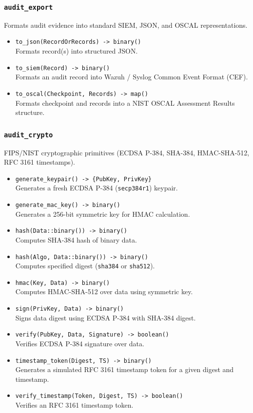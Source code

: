\documentclass{article}
\begin{document}
\subsubsection{\texttt{audit\_export}}
Formats audit evidence into standard SIEM, JSON, and OSCAL representations.
\begin{itemize}
    \item \texttt{to\_json(RecordOrRecords) -> binary()} \\
    Formats record(s) into structured JSON.
    \item \texttt{to\_siem(Record) -> binary()} \\
    Formats an audit record into Wazuh / Syslog Common Event Format (CEF).
    \item \texttt{to\_oscal(Checkpoint, Records) -> map()} \\
    Formats checkpoint and records into a NIST OSCAL Assessment Results structure.
\end{itemize}

\subsubsection{\texttt{audit\_crypto}}
FIPS/NIST cryptographic primitives (ECDSA P-384, SHA-384, HMAC-SHA-512, RFC 3161 timestamps).
\begin{itemize}
    \item \texttt{generate\_keypair() -> \{PubKey, PrivKey\}} \\
    Generates a fresh ECDSA P-384 (\texttt{secp384r1}) keypair.
    \item \texttt{generate\_mac\_key() -> binary()} \\
    Generates a 256-bit symmetric key for HMAC calculation.
    \item \texttt{hash(Data::binary()) -> binary()} \\
    Computes SHA-384 hash of binary data.
    \item \texttt{hash(Algo, Data::binary()) -> binary()} \\
    Computes specified digest (\texttt{sha384} or \texttt{sha512}).
    \item \texttt{hmac(Key, Data) -> binary()} \\
    Computes HMAC-SHA-512 over data using symmetric key.
    \item \texttt{sign(PrivKey, Data) -> binary()} \\
    Signs data digest using ECDSA P-384 with SHA-384 digest.
    \item \texttt{verify(PubKey, Data, Signature) -> boolean()} \\
    Verifies ECDSA P-384 signature over data.
    \item \texttt{timestamp\_token(Digest, TS) -> binary()} \\
    Generates a simulated RFC 3161 timestamp token for a given digest and timestamp.
    \item \texttt{verify\_timestamp(Token, Digest, TS) -> boolean()} \\
    Verifies an RFC 3161 timestamp token.
\end{itemize}
\end{document}
